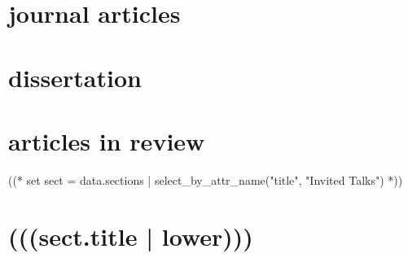 \documentclass[10pt,oneside]{article}
\begin{document}
%
%


\section{\color{BrickRed}journal articles}

\mbox{}\vspace{-\dimexpr\baselineskip\relax}
\vspace*{-1em}

\printbibliography[type=article, heading=none]

\section{\color{BrickRed}dissertation}

\mbox{}\vspace{-\dimexpr\baselineskip\relax}
\vspace*{-1em}
\printbibliography[type=thesis, heading=none]

\section{\color{BrickRed}articles in review}

\mbox{}\vspace{-\dimexpr\baselineskip\relax}
\vspace*{-1em}
\printbibliography[type=unpublished, heading=none]

((* set sect = data.sections | select_by_attr_name("title", "Invited Talks") *))
\section{\color{BrickRed}(((sect.title | lower)))}
\end{document}

